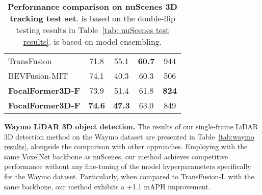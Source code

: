 \documentclass[10pt,twocolumn,letterpaper]{article}
\begin{document}
\begin{table}[t]
\begin{center}
{\begin{tabular}{lcccc}
                TransFusion~\cite{transfusion} & 71.8 & 55.1 & \textbf{60.7} & 944 \\
                BEVFusion-MIT~\cite{bevfusionmit} & 74.1 & 40.3 & 60.3 & 506 \\ 
                \midrule
                \textbf{FocalFormer3D-F} & 73.9 & 51.4 & 61.8 & \textbf{824} \\
                \textbf{FocalFormer3D-F} & \textbf{74.6} & \textbf{47.3} & 63.0 & 849 \\
			\bottomrule
		\end{tabular}}
	\end{center}
	\caption{\textbf{Performance comparison on nuScenes 3D tracking test set}.  is based on the double-flip testing results in Table~\ref{tab: nuScenes test results}.  is based on model ensembling. } \label{tab: nuscenes tracking}
 \vspace{-1mm}
\end{table}

\vspace{2mm}
\noindent\textbf{Waymo LiDAR 3D object detection.}
The results of our single-frame LiDAR 3D detection method on the Waymo dataset are presented in Table~\ref{tab:waymo results}, alongside the comparison with other approaches. Employing with the same VoxelNet backbone as nuScenes, our method achieves competitive performance without any fine-tuning of the model hyperparameters specifically for the Waymo dataset. Particularly, when compared to TransFusion-L with the same backbone, our method exhibits a +1.1 mAPH improvement.
\end{document}
